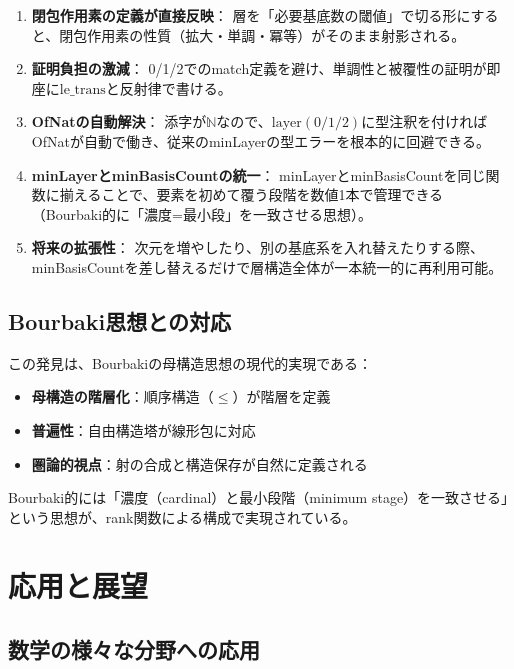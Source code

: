 \documentclass[a4paper,12pt]{ltjsarticle}
\theoremstyle{definition}
\begin{document}
\begin{enumerate}
\item \textbf{閉包作用素の定義が直接反映}：
層を「必要基底数の閾値」で切る形にすると、閉包作用素の性質（拡大・単調・冪等）がそのまま射影される。

\item \textbf{証明負担の激減}：
0/1/2でのmatch定義を避け、単調性と被覆性の証明が即座に$\text{le\_trans}$と反射律で書ける。

\item \textbf{OfNatの自動解決}：
添字が$\mathbb{N}$なので、$\text{layer}(0/1/2)$に型注釈を付ければOfNatが自動で働き、従来のminLayerの型エラーを根本的に回避できる。

\item \textbf{minLayerとminBasisCountの統一}：
minLayerとminBasisCountを同じ関数に揃えることで、要素を初めて覆う段階を数値1本で管理できる（Bourbaki的に「濃度=最小段」を一致させる思想）。

\item \textbf{将来の拡張性}：
次元を増やしたり、別の基底系を入れ替えたりする際、minBasisCountを差し替えるだけで層構造全体が一本統一的に再利用可能。
\end{enumerate}

\subsection{Bourbaki思想との対応}

この発見は、Bourbakiの母構造思想の現代的実現である：

\begin{itemize}
\item \textbf{母構造の階層化}：順序構造（$\leq$）が階層を定義
\item \textbf{普遍性}：自由構造塔が線形包に対応
\item \textbf{圏論的視点}：射の合成と構造保存が自然に定義される
\end{itemize}

Bourbaki的には「濃度（cardinal）と最小段階（minimum stage）を一致させる」という思想が、rank関数による構成で実現されている。

\section{応用と展望}

\subsection{数学の様々な分野への応用}
\end{document}
